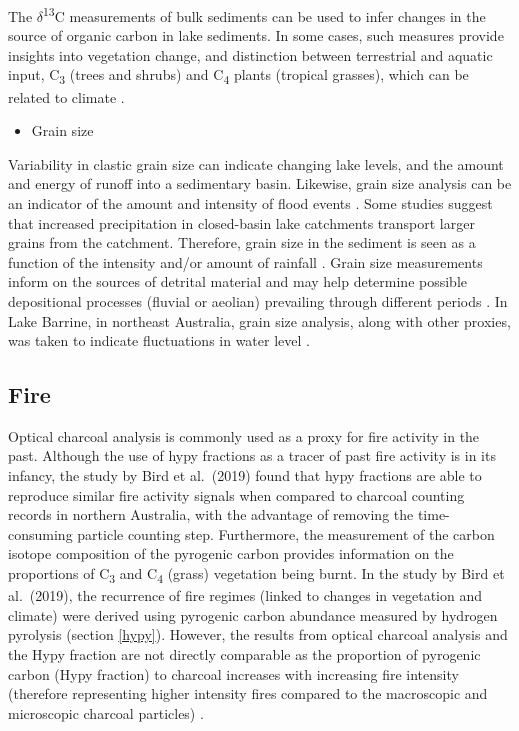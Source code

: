 \documentclass[
  12pt,
]{book}
\providecommand{\tightlist}{%
  \setlength{\itemsep}{0pt}\setlength{\parskip}{0pt}}
\begin{document}
The \(\delta\)\textsuperscript{13}C measurements of bulk sediments can be used to infer changes in the source of organic carbon in lake sediments. In some cases, such measures provide insights into vegetation change, and distinction between terrestrial and aquatic input, C\textsubscript{3} (trees and shrubs) and C\textsubscript{4} plants (tropical grasses), which can be related to climate \citep{maysStableCarbonIsotopes2017}.

\begin{itemize}
\tightlist
\item
  Grain size
\end{itemize}

Variability in clastic grain size can indicate changing lake levels, and the amount and energy of runoff into a sedimentary basin. Likewise, grain size analysis can be an indicator of the amount and intensity of flood events \citep{conroyHoloceneChangesEastern2008}. Some studies suggest that increased precipitation in closed-basin lake catchments transport larger grains from the catchment. Therefore, grain size in the sediment is seen as a function of the intensity and/or amount of rainfall \citep{chenEnvironmentalRecordsLacustrine2004}. Grain size measurements inform on the sources of detrital material and may help determine possible depositional processes (fluvial or aeolian) prevailing through different periods \citep{burrowsNewLateQuaternary2016a}. In Lake Barrine, in northeast Australia, grain size analysis, along with other proxies, was taken to indicate fluctuations in water level \citep{walkerHoloceneSedimentsLake2007}.

\hypertarget{fire-1}{%
\subsection{Fire}\label{fire-1}}

Optical charcoal analysis is commonly used as a proxy for fire activity in the past. Although the use of hypy fractions as a tracer of past fire activity is in its infancy, the study by Bird et al.~(2019) found that hypy fractions are able to reproduce similar fire activity signals when compared to charcoal counting records in northern Australia, with the advantage of removing the time-consuming particle counting step. Furthermore, the measurement of the carbon isotope composition of the pyrogenic carbon provides information on the proportions of C\textsubscript{3} and C\textsubscript{4} (grass) vegetation being burnt. In the study by Bird et al.~(2019), the recurrence of fire regimes (linked to changes in vegetation and climate) were derived using pyrogenic carbon abundance measured by hydrogen pyrolysis \citep{wursterQuantifyingAbundanceStable2012} (section \ref{hypy}). However, the results from optical charcoal analysis and the Hypy fraction are not directly comparable as the proportion of pyrogenic carbon (Hypy fraction) to charcoal increases with increasing fire intensity (therefore representing higher intensity fires compared to the macroscopic and microscopic charcoal particles) \citep{birdIsotopesPyrogenicCarbon2012}.
\end{document}
